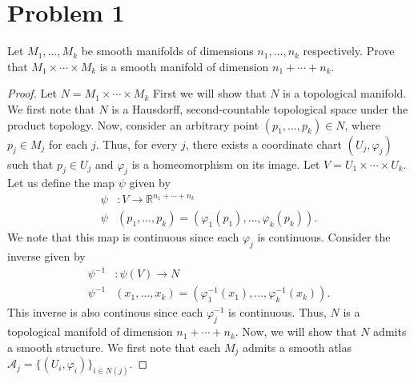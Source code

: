 \documentclass[a4paper]{article}
\begin{document}
\section*{Problem 1}%
\label{sec:Problem 1}

Let $M_1, \dots, M_k$ be smooth manifolds of dimensions $n_1, \dots, n_k$ respectively. Prove that $M_1 \times \cdots \times M_k$ is a smooth manifold of dimension $n_1 + \cdots + n_k$.

\begin{proof}
  Let $N = M_1 \times \cdots \times M_k$ First we will show that $N$ is a topological manifold. We first note that $N$ is a Hausdorff, second-countable topological space under the product topology. Now, consider an arbitrary point $(p_1, \dots, p_k) \in N$, where $p_j \in M_j$ for each $j$. Thus, for every $j$, there exists a coordinate chart $(U_j, \varphi_j)$ such that $p_j \in U_j$ and $\varphi_j$ is a homeomorphism on its image. Let $V = U_1 \times \cdots \times U_k$. Let us define the map $\psi$ given by
  \[
    \begin{aligned}
      \psi&: V \rightarrow \mathds{R}^{n_1 + \cdots + n_k} \\
      \psi&(p_1, \dots, p_k) = (\varphi_1(p_1), \dots, \varphi_k(p_k)).
    \end{aligned}
  \]
  We note that this map is continuous since each $\varphi_j$ is continuous. Consider the inverse given by
  \[
    \begin{aligned}
      \psi^{-1}&: \psi(V) \rightarrow N \\
      \psi^{-1}&(x_1, \dots, x_k) = (\varphi^{-1}_1(x_1), \dots, \varphi^{-1}_k(x_k)).
    \end{aligned}
  \]
  This inverse is also continous since each $\varphi_j^{-1}$ is continuous. Thus, $N$ is a topological manifold of dimension $n_1 + \cdots + n_k$. Now, we will show that $N$ admits a smooth structure. We first note that each $M_j$ admits a smooth atlas $\mathcal{A}_j = \{(U_i, \varphi_i)\}_{i \in N(j)}$. 
\end{proof}
\end{document}
